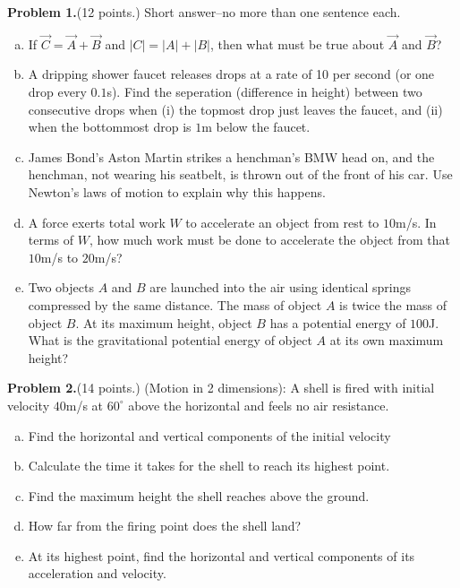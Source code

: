 \documentclass[12pt]{article}
\begin{document}
\bigskip

\bigskip

{\bf Problem 1.}(12 points.) Short answer--no more than one sentence each. 
\begin{enumerate}[(a)]
\item If $\vec{C} = \vec{A} + \vec{B}$ and $|C| = |A| + |B|$, then what must be true about $\vec{A}$ and $\vec{B}$?
\bigskip
\bigskip
\bigskip
\bigskip
\bigskip
\item A dripping shower faucet releases drops at a rate of 10 per second (or one drop every $0.1$s). Find the seperation (difference in height) between two consecutive drops when (i) the topmost drop just leaves the faucet, and (ii) when the bottommost drop is $1$m below the faucet.
\bigskip
\bigskip
\bigskip
\bigskip
\bigskip
\bigskip
\bigskip
\bigskip
\bigskip
\item James Bond's Aston Martin strikes a henchman's BMW head on, and the henchman, not wearing his seatbelt, is thrown out of the front of his car. Use Newton's laws of motion to explain why this happens.
\bigskip
\bigskip
\bigskip
\bigskip
\bigskip
\bigskip
\bigskip
\item A force exerts total work $W$ to accelerate an object from rest to $10$m/s. In terms of $W$, how much work must be done to accelerate the object from that $10$m/s to $20$m/s? 
\bigskip
\bigskip
\bigskip
\bigskip
\bigskip
\item Two objects $A$ and $B$ are launched into the air using identical springs compressed by the same distance. The mass of object $A$ is twice the mass of object $B$. At its maximum height, object $B$ has a potential energy of $100$J. What is the gravitational potential energy of object $A$ at its own maximum height?
\bigskip
\bigskip
\bigskip
\bigskip
\bigskip
\end{enumerate}
\newpage
{\bf Problem 2.}(14 points.) (Motion in 2 dimensions):
A shell is fired with initial velocity $40$m/s at $60^\circ$ above the horizontal and feels no air resistance.
\begin{enumerate}[(a)]
\item Find the horizontal and vertical components of the initial velocity
\bigskip
\bigskip
\bigskip
\bigskip
\bigskip
\item Calculate the time it takes for the shell to reach its highest point.
\bigskip
\bigskip
\bigskip
\bigskip
\bigskip
\bigskip
\bigskip
\item Find the maximum height the shell reaches above the ground.
\bigskip
\bigskip
\bigskip
\bigskip
\bigskip
\bigskip
\bigskip
\item How far from the firing point does the shell land?
\bigskip
\bigskip
\bigskip
\bigskip
\bigskip
\bigskip
\bigskip
\item At its highest point, find the horizontal and vertical components of its acceleration and velocity.
\bigskip
\bigskip
\bigskip
\bigskip
\bigskip
\end{enumerate}
\end{document}
